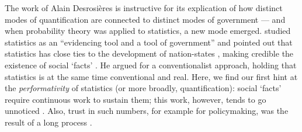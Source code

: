 \documentclass[11pt]{article} %
\begin{document}
The work of Alain Desrosières \citeyearpar{desrosieres1998politics} is instructive for its explication of how distinct modes of quantification are connected to distinct modes of government --- and when probability theory was applied to statistics, a new mode emerged. \citet{desrosieres1998politics} studied statistics as an ``evidencing tool and a tool of government'' and pointed out that statistics has close ties to the development of nation-states \citep{armatte2016introduction}, making credible the existence of social `facts' \citep{mcfall2011good}. He argued for a conventionalist approach, holding that statistics is at the same time conventional and real. 
Here, we find our first hint at the \textit{performativity} of statistics (or more broadly, quantification): social `facts' require continuous work to sustain them; this work, however, tends to go unnoticed \citep{espeland2008sociology}. Also, trust in such numbers, for example for policymaking, was the result of a long process \citep{porter1996trust,mcfall2011good}.
\end{document}

